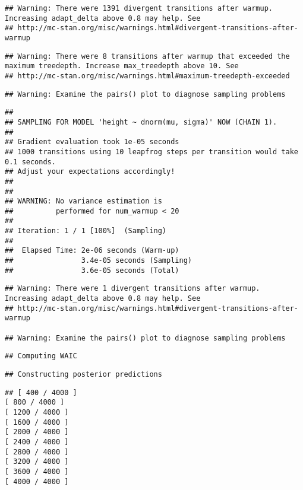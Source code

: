 \documentclass[]{article}
\begin{document}
\begin{verbatim}
## Warning: There were 1391 divergent transitions after warmup. Increasing adapt_delta above 0.8 may help. See
## http://mc-stan.org/misc/warnings.html#divergent-transitions-after-warmup
\end{verbatim}

\begin{verbatim}
## Warning: There were 8 transitions after warmup that exceeded the maximum treedepth. Increase max_treedepth above 10. See
## http://mc-stan.org/misc/warnings.html#maximum-treedepth-exceeded
\end{verbatim}

\begin{verbatim}
## Warning: Examine the pairs() plot to diagnose sampling problems
\end{verbatim}

\begin{verbatim}
## 
## SAMPLING FOR MODEL 'height ~ dnorm(mu, sigma)' NOW (CHAIN 1).
## 
## Gradient evaluation took 1e-05 seconds
## 1000 transitions using 10 leapfrog steps per transition would take 0.1 seconds.
## Adjust your expectations accordingly!
## 
## 
## WARNING: No variance estimation is
##          performed for num_warmup < 20
## 
## Iteration: 1 / 1 [100%]  (Sampling)
## 
##  Elapsed Time: 2e-06 seconds (Warm-up)
##                3.4e-05 seconds (Sampling)
##                3.6e-05 seconds (Total)
\end{verbatim}

\begin{verbatim}
## Warning: There were 1 divergent transitions after warmup. Increasing adapt_delta above 0.8 may help. See
## http://mc-stan.org/misc/warnings.html#divergent-transitions-after-warmup

## Warning: Examine the pairs() plot to diagnose sampling problems
\end{verbatim}

\begin{verbatim}
## Computing WAIC
\end{verbatim}

\begin{verbatim}
## Constructing posterior predictions
\end{verbatim}

\begin{verbatim}
## [ 400 / 4000 ]
[ 800 / 4000 ]
[ 1200 / 4000 ]
[ 1600 / 4000 ]
[ 2000 / 4000 ]
[ 2400 / 4000 ]
[ 2800 / 4000 ]
[ 3200 / 4000 ]
[ 3600 / 4000 ]
[ 4000 / 4000 ]
\end{verbatim}
\end{document}
